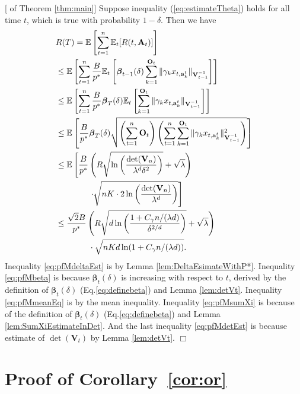 \documentclass{article}
\newcommand{\bbeta}{\boldsymbol{\beta}}
\newcommand{\EE}{\mathbb{E}}
\newcommand{\bA}{\mathbf{A}}
\newcommand{\ba}{\mathbf{a}}
\newcommand{\bO}{\mathbf{O}}
\newcommand{\bV}{\mathbf{V}}
\newcommand{\norm}[1]{\| #1 \|}
\newenvironment{proof}{\noindent {\textbf{Proof. }}}{$\Box$ \medskip}
\begin{document}
\begin{proof}[ of Theorem \ref{thm:main}]
	Suppose inequality (\ref{eq:estimateTheta}) holds for all time $t$, which is true with probability $1-\delta$. Then we have
	\begin{align}
	&R(T) = \EE \left[\sum_{t=1}^{n} \EE_{t}[R(t, \bA_t)] \right] \notag\\
	&\leq \EE\left[\sum_{t=1}^{n} \frac{B}{p^*} \EE_t \left[\bbeta_{t-1}(\delta) \sum_{k=1}^{\bO_t}\norm{\gamma_k x_{t,\ba_k^t}}_{\bV_{t-1}^{-1}}\right] \right] \label{eq:pfMdeltaEst}\\
	&\leq \EE\left[\sum_{t=1}^{n} \frac{B}{p^*} \bbeta_{T}(\delta) \EE_t \left[ \sum_{k=1}^{\bO_t}\norm{\gamma_k x_{t,\ba_k^t}}_{\bV_{t-1}^{-1}}\right] \right] \label{eq:pfMbeta}\\
	&\leq \EE \left[\frac{B}{p^*} \bbeta_T(\delta) \sqrt{\left(\sum_{t=1}^{n} \bO_t\right) \left( \sum_{t=1}^{n} \sum_{k=1}^{\bO_t}\norm{\gamma_k x_{t,\ba_k^t}}_{\bV_{t-1}^{-1}}^2 \right)} \right ]  \label{eq:pfMmeanEq}\\
	&\leq \EE\left[\frac{B}{p^*} \left( R \sqrt{ \ln \left( \frac{\det(\bV_n)}{\lambda^d \delta^2} \right)} + \sqrt{\lambda} \right) \right. \notag\\
	& \left. \qquad \qquad \cdot \sqrt{nK \cdot 2\ln \left(\frac{\det(\bV_n)}{\lambda^d} \right)} \right] \label{eq:pfMsumXi}\\
	&\leq \frac{\sqrt{2}B}{p^*} \left(R\sqrt{ d \ln \left( \frac{1 + C_\gamma n/(\lambda d)}{\delta^{2/d}} \right) } + \sqrt{\lambda} \right) \notag\\
	&\qquad \qquad \cdot \sqrt{nKd\ln(1 + C_\gamma n/(\lambda d))}. \label{eq:pfMdetEst}
	\end{align}
	Inequality \eqref{eq:pfMdeltaEst} is by Lemma \ref{lem:DeltaEsimateWithP*}. 
	Inequality \eqref{eq:pfMbeta} is because $\bbeta_{t}(\delta)$ is increasing with respect to $t$, derived by the definition of $\bbeta_t(\delta)$ (Eq.\eqref{eq:definebeta}) and Lemma \ref{lem:detVt}. 
	Inequality \eqref{eq:pfMmeanEq} is by the mean inequality. 
	Inequality \eqref{eq:pfMsumXi} is because of the definition of $\bbeta_t(\delta)$ (Eq.\eqref{eq:definebeta}) and Lemma \ref{lem:SumXiEstimateInDet}. 
	And the last inequality \eqref{eq:pfMdetEst} is because estimate of $\det(\bV_t)$ by Lemma \ref{lem:detVt}.
\end{proof}

\section{Proof of Corollary~\ref{cor:or}}
\end{document}
